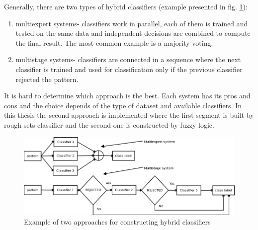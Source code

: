 Generally, there are two types of hybrid classifiers (example presented in fig.
\ref{fig:hybrid}):
\begin{enumerate}
    \item multiexpert systems- classifiers work in parallel, each of them is
        trained and tested on the same data and independent decisions are
        combined to compute the final result. The most common example is a
        majority voting.
    \item multistage systems- classifiers are connected in a sequence where the
        next classifier is trained and used for classification only if the
        previous classifier rejected the pattern. 
\end{enumerate}
It is hard to determine which approach is the best. Each system has its pros
and cons and the choice depends of the type of dataset and available
classifiers. In this thesis the second approach is implemented where the first
segment is built by rough sets classifier and the second one is constructed by
fuzzy logic.
\begin{figure}[H] 
    \begin{center}
        \includegraphics[width=\textwidth]{fig/hybrid.png}
    \end{center}
    \caption{Example of two approaches for constructing hybrid classifiers}
    \label{fig:hybrid}
\end{figure}


